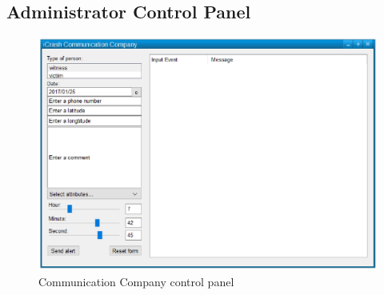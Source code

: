 \subsection{Administrator Control Panel}

\begin{figure}
  \centering
    \includegraphics[width=12cm]{images/mockups/feature2-access-rights/CommunicationCompany.eps}
  \caption{Communication Company control panel}
  \label{fig:CommunicationCompanyControlPanel}
\end{figure}
